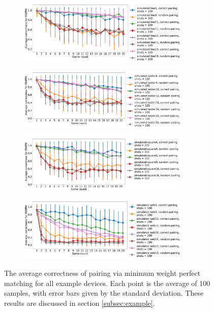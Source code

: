 \documentclass[aps,prl,twocolumn,showpacs,preprintnumbers]{revtex4-1}
\begin{document}
\begin{figure}
    \centering
    \begin{subfigure}[b]{\textwidth}
        \includegraphics[width=0.9\textwidth]{figures/line_mwpm.png}
    \end{subfigure}
    \begin{subfigure}[b]{\textwidth}
        \includegraphics[width=0.9\textwidth]{figures/ladder_mwpm.png}
    \end{subfigure}
    \begin{subfigure}[b]{\textwidth}
        \includegraphics[width=0.9\textwidth]{figures/square_mwpm.png}
    \end{subfigure}
    \begin{subfigure}[b]{\textwidth}
        \includegraphics[width=0.9\textwidth]{figures/web_mwpm.png}
    \end{subfigure}
    \caption{The average correctness of pairing via minimum weight perfect matching for all example devices. Each point is the average of 100 samples, with error bars given by the standard deviation. These results are discussed in section \ref{subsec:example}.}\label{fig:example_mwpm}
\end{figure}
\pagebreak
\end{document}

